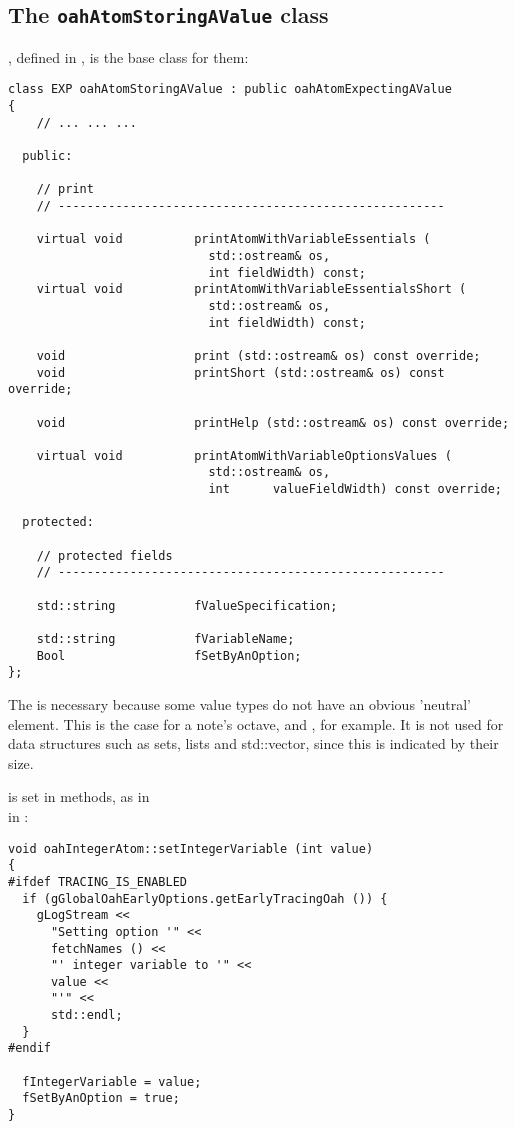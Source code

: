 \subsection{The {\tt oahAtomStoringAValue} class}

, defined in , is the base class   for them:
\begin{lstlisting}[language=CPlusPlus]
class EXP oahAtomStoringAValue : public oahAtomExpectingAValue
{
	// ... ... ...

  public:

    // print
    // ------------------------------------------------------

    virtual void          printAtomWithVariableEssentials (
                            std::ostream& os,
                            int fieldWidth) const;
    virtual void          printAtomWithVariableEssentialsShort (
                            std::ostream& os,
                            int fieldWidth) const;

    void                  print (std::ostream& os) const override;
    void                  printShort (std::ostream& os) const override;

    void                  printHelp (std::ostream& os) const override;

    virtual void          printAtomWithVariableOptionsValues (
                            std::ostream& os,
                            int      valueFieldWidth) const override;

  protected:

    // protected fields
    // ------------------------------------------------------

    std::string           fValueSpecification;

    std::string           fVariableName;
    Bool                  fSetByAnOption;
};
\end{lstlisting}

The  is necessary because some value types do not have an obvious 'neutral' element. This is the case for a note's octave,  and , for example. It is not used for data structures such as sets, lists and std::vector, since this is indicated by their size.

 is set in  methods, as in \\
in :
\begin{lstlisting}[language=CPlusPlus]
void oahIntegerAtom::setIntegerVariable (int value)
{
#ifdef TRACING_IS_ENABLED
  if (gGlobalOahEarlyOptions.getEarlyTracingOah ()) {
    gLogStream <<
      "Setting option '" <<
      fetchNames () <<
      "' integer variable to '" <<
      value <<
      "'" <<
      std::endl;
  }
#endif

  fIntegerVariable = value;
  fSetByAnOption = true;
}
\end{lstlisting}


